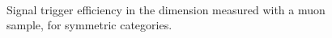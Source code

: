 \begin{figure}[h!]
\begin{center}
     \\
    \caption{Signal trigger efficiency in the \mht dimension measured with a muon sample, for symmetric categories.}
    \label{fig:alphat_turnons_sym}
  \end{center}
\end{figure}

